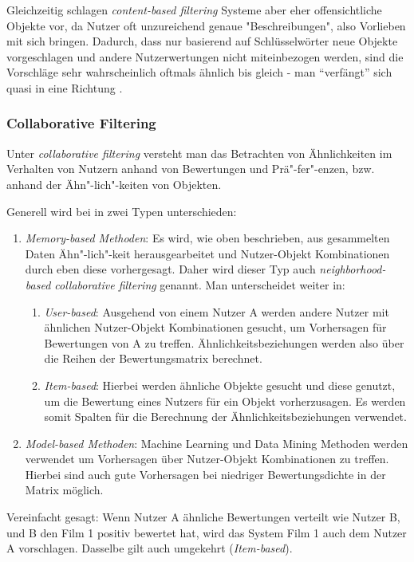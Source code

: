 \noindent
Gleichzeitig schlagen \textit{content-based filtering} Systeme aber eher offensichtliche Objekte vor, da Nutzer oft unzureichend genaue "Beschreibungen", also Vorlieben mit sich bringen. Dadurch, dass nur basierend auf Schlüsselwörter neue Objekte vorgeschlagen und andere Nutzerwertungen nicht miteinbezogen werden, sind die Vorschläge sehr wahrscheinlich oftmals ähnlich bis gleich - man \enquote{verfängt} sich quasi in eine Richtung \cite{aggarwal2016}.

\subsubsection{Collaborative Filtering}
Unter \textit{collaborative filtering} versteht man das Betrachten von Ähnlichkeiten im Verhalten von Nutzern anhand von Bewertungen und Prä"-fer"-enzen, bzw. anhand der Ähn"-lich"-keiten von Objekten.

\noindent
Generell wird bei \cite{aggarwal2016} in zwei Typen unterschieden:

\begin{enumerate}		
	\item \textit{Memory-based Methoden}: Es wird, wie oben beschrieben, aus gesammelten Daten Ähn"-lich"-keit herausgearbeitet und Nutzer-Objekt Kombinationen durch eben diese vorhergesagt. Daher wird dieser Typ auch \textit{neighborhood-based collaborative filtering} genannt. Man unterscheidet weiter in:
	\begin{enumerate}
		\item \textit{User-based}: Ausgehend von einem Nutzer A werden andere Nutzer mit ähnlichen Nutzer-Objekt Kombinationen gesucht, um Vorhersagen für Bewertungen von A zu treffen. Ähnlichkeitsbeziehungen werden also über die Reihen der Bewertungsmatrix berechnet.
		\item \textit{Item-based}: Hierbei werden ähnliche Objekte gesucht und diese genutzt, um die Bewertung eines Nutzers für ein Objekt vorherzusagen. Es werden somit Spalten für die Berechnung der Ähnlichkeitsbeziehungen verwendet.
	\end{enumerate}
	\item \textit{Model-based Methoden}: Machine Learning und Data Mining Methoden werden verwendet um Vorhersagen über Nutzer-Objekt Kombinationen zu treffen. Hierbei sind auch gute Vorhersagen bei niedriger Bewertungsdichte in der Matrix möglich.
\end{enumerate}

\noindent
Vereinfacht gesagt: Wenn Nutzer A ähnliche Bewertungen verteilt wie Nutzer B, und B den Film 1 positiv bewertet hat, wird das System Film 1 auch dem Nutzer A vorschlagen. Dasselbe gilt auch umgekehrt (\textit{Item-based}).

